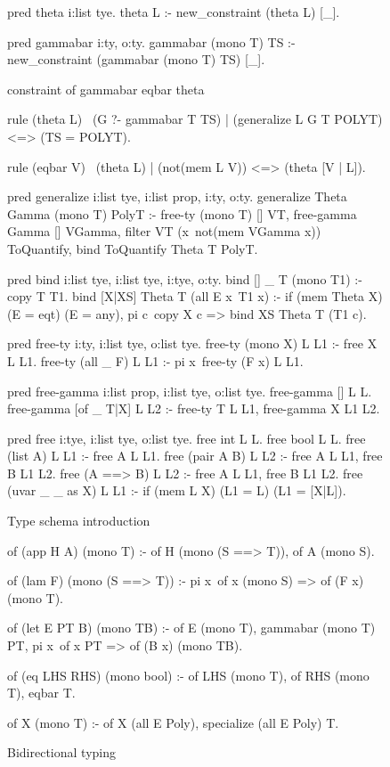 \documentclass[a4paper, 11pt]{book}
\begin{document}
\begin{figure}
\begin{elpicode}
pred theta i:list tye.
theta L :- new_constraint (theta L) [_].

pred gammabar i:ty, o:ty.
gammabar (mono T) TS :- new_constraint (gammabar (mono T) TS) [_].

constraint of gammabar eqbar theta {
  rule (theta L)                    %
        \  (G ?- gammabar T TS)     %
        |  (generalize L G T POLYT) %
      <=> (TS = POLYT).             %

  rule (eqbar V) \ (theta L) | (not(mem L V)) <=> (theta [V | L]).
}

pred generalize i:list tye, i:list prop, i:ty, o:ty.
generalize Theta Gamma (mono T) PolyT :-
  free-ty (mono T) [] VT,
  free-gamma Gamma [] VGamma,
  filter VT (x\ not(mem VGamma x)) ToQuantify,
  bind ToQuantify Theta T PolyT.

pred bind i:list tye, i:list tye, i:tye, o:ty.
bind [] _ T (mono T1) :- copy T T1.
bind [X|XS] Theta T (all E x\ T1 x) :-
  if (mem Theta X) (E = eqt) (E = any),
  pi c\ copy X c => bind XS Theta T (T1 c).

pred free-ty i:ty, i:list tye, o:list tye.
free-ty (mono X) L L1 :- free X L L1.
free-ty (all _ F) L L1 :- pi x\ free-ty (F x) L L1.

pred free-gamma i:list prop, i:list tye, o:list tye.
free-gamma [] L L.
free-gamma [of _ T|X] L L2 :- free-ty T L L1, free-gamma X L1 L2.

pred free i:tye, i:list tye, o:list tye.
free int L L.
free bool L L.
free (list A) L L1 :- free A L L1.
free (pair A B) L L2 :- free A L L1, free B L1 L2.
free (A ==> B) L L2 :- free A L L1, free B L1 L2.
free (uvar _ _ as X) L L1 :- if (mem L X) (L1 = L) (L1 = [X|L]).
\end{elpicode}
\caption[schema introduction]{Type schema introduction\label{hm:intro}}
\end{figure}


\begin{figure}
\begin{elpicode}
of (app H A) (mono T) :-
  of H (mono (S ==> T)),
  of A (mono S).

of (lam F) (mono (S ==> T)) :-
  pi x\ of x (mono S) => of (F x) (mono T).

of (let E PT B) (mono TB) :-
  of E (mono T),
  gammabar (mono T) PT,
  pi x\ of x PT => of (B x) (mono TB).

of (eq LHS RHS) (mono bool) :-
  of LHS (mono T),
  of RHS (mono T),
  eqbar T.

of X (mono T) :- of X (all E Poly), specialize (all E Poly) T.
\end{elpicode}
\caption[bidirectional]{Bidirectional typing\label{hm:bidir}}
\end{figure}
\end{document}
